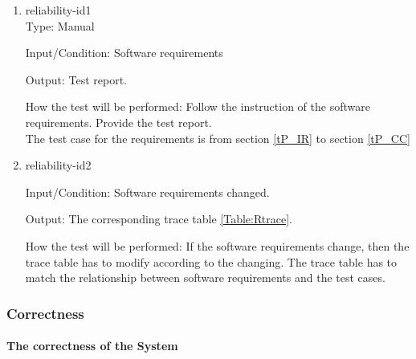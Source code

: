 \documentclass[12pt, titlepage]{article}
\begin{document}
\begin{enumerate} 
\item{reliability-id1\\} 
Type: Manual

Input/Condition: Software requirements

Output: Test report.

How the test will be performed: Follow the instruction of the software requirements. Provide the test report.\\
The test case for the \progname requirements is from section \ref{tP_IR} to section \ref{tP_CC}

\item{reliability-id2\\} 

Input/Condition: Software requirements changed.

Output: The corresponding trace table \ref{Table:Rtrace}.

How the test will be performed: If the software requirements change, then the trace table has to modify according to the changing. The trace table has to match the relationship between software requirements and the test cases.

\end{enumerate} 

\subsubsection{Correctness}
\paragraph{The correctness of the System}
\end{document}
